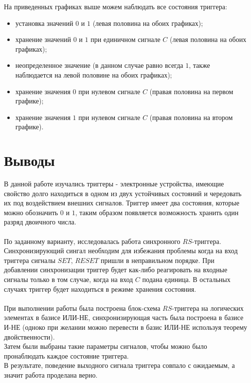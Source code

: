 \documentclass[12pt]{article}
\begin{document}
На приведенных графиках выше можем наблюдать все состояния триггера: 
\begin{itemize}
    \item установка значений $0$ и $1$ (левая половина на обоих графиках);
    \item хранение значений $0$ и $1$ при единичном сигнале $C$ (левая половина на обоих графиках);
    \item неопределенное значение (в данном случае равно всегда $1$, также наблюдается на левой половине на обоих графиках);
    \item хранение значения $0$ при нулевом сигнале $C$ (правая половина на первом графике);
    \item хранение значения $1$ при нулевом сигнале $C$ (правая половина на втором графике).
\end{itemize}

\section*{Выводы}
В данной работе изучались триггеры - электронные устройства, имеющие свойство долго находиться в одном из двух устойчивых состояний и чередовать их под воздействием внешних сигналов. Триггер имеет два состояния, которые можно обозначить $0$ и $1$, таким образом появляется возможность хранить один разряд двоичного числа. \\
\ \\
По заданному варианту, исследовалась работа синхронного $RS$-триггера. Синхронизирующий сингал необходим для избежания проблемы когда на вход триггера сигналы $SET$, $RESET$ пришли в неправильном порядке. При добавлении синхронизации триггер будет как-либо реагировать на входные сигналы только в том случае, когда на вход $C$ подана единица. В остальных случаях триггер будет находиться в режиме хранения состояния.\\
\ \\
При выполнении работы была построена блок-схема $RS$-триггера на логических элементах в базисе ИЛИ-НЕ, синхронизирующая часть была построена в базисе И-НЕ (одноко при желании можно перевести в базис ИЛИ-НЕ используя теорему двойственности). \\
Затем были выбраны такие параметры сигналов, чтобы можно было пронаблюдать каждое состояние триггера. \\
В результате, поведение выходного сигнала триггера совпало с ожидаемым, а значит работа проделана верно. 
\end{document}

